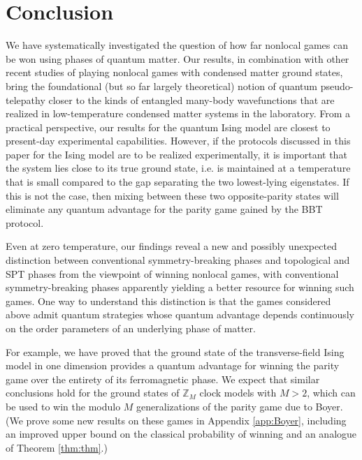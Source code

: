\documentclass[prb,twocolumn,showpacs,amssymb,superscriptaddress]{revtex4-2}
\begin{document}
\section{Conclusion}

We have systematically investigated the question of how far nonlocal games can be won using phases of quantum matter. Our results, in combination with other recent studies of playing nonlocal games with condensed matter ground states\cite{DanielMiyake,companion}, bring the foundational (but so far largely theoretical) notion of quantum pseudo-telepathy\cite{Brassard2005} closer to the kinds of entangled many-body wavefunctions that are realized in low-temperature condensed matter systems in the laboratory. From a practical perspective, our results for the quantum Ising model are closest to present-day experimental capabilities\cite{Coldea_2010}. However, if the protocols discussed in this paper for the Ising model are to be realized experimentally, it is important that the system lies close to its true ground state, i.e. is maintained at a temperature that is small compared to the gap separating the two lowest-lying eigenstates. If this is not the case, then mixing between these two opposite-parity states will eliminate any quantum advantage for the parity game gained by the BBT protocol.

Even at zero temperature, our findings reveal a new and possibly unexpected distinction between conventional symmetry-breaking phases and topological and SPT phases from the viewpoint of winning nonlocal games, with conventional symmetry-breaking phases apparently yielding a better resource for winning such games. One way to understand this distinction is that the games considered above admit quantum strategies whose quantum advantage depends continuously on the order parameters of an underlying phase of matter.

For example, we have proved that the ground state of the transverse-field Ising model in one dimension provides a quantum advantage for winning the parity game over the entirety of its ferromagnetic phase. We expect that similar conclusions hold for the ground states of $\mathbb{Z}_M$ clock models with $M>2$, which can be used to win the modulo $M$ generalizations of the parity game due to Boyer\cite{boyer2004extended}. (We prove some new results on these games in Appendix \ref{app:Boyer}, including an improved upper bound on the classical probability of winning and an analogue of Theorem \ref{thm:thm}.)
\end{document}
